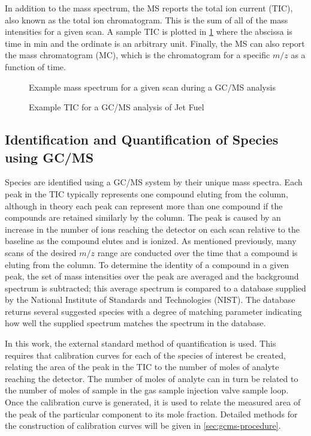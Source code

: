 \documentclass[../main.tex]{subfiles}
\begin{document}
In addition to the mass spectrum, the MS reports the total ion current (TIC),
also known as the total ion chromatogram. This is the sum of all of the mass
intensities for a given scan. A sample TIC is plotted in \cref{fig:gcms-tic}
where the abscissa is time in \si{\minute} and the ordinate is an arbitrary unit.
Finally, the MS can also report the mass chromatogram (MC), which is the
chromatogram for a specific $m/z$ as a function of time.

\begin{figure}
    \begin{floatrow}
            {\caption{Example mass spectrum for a given scan during a GC/MS analysis}
            \label{fig:gcms-mass-spec}}
            {\caption{Example TIC for a GC/MS analysis of Jet Fuel}
            \label{fig:gcms-tic}}
    \end{floatrow}
\end{figure}

\subsection{Identification and Quantification of Species using GC/MS}

Species are identified using a GC/MS system by their unique mass spectra.
Each peak in the TIC typically represents one compound eluting from the
column, although in theory each peak can represent more than one compound
if the compounds are retained similarly by the column. The peak is caused
by an increase in the number of ions reaching the detector on each scan
relative to the baseline as the compound elutes and is ionized. As
mentioned previously, many scans of the desired $m/z$ range are
conducted over the time that a compound is eluting from the column.
To determine the identity of a compound in a given peak, the set of
mass intensities over the peak are averaged and the background
spectrum is subtracted; this average spectrum is compared to a
database supplied by the National Institute of Standards and
Technologies (NIST). The database returns several suggested species
with a degree of matching parameter indicating how well the supplied
spectrum matches the spectrum in the database.

In this work, the external standard method of quantification is used.
This requires that calibration curves for each of the species of
interest be created, relating the area of the peak in the TIC to
the number of moles of analyte reaching the detector. The number of
moles of analyte can in turn be related to the number of moles of
sample in the gas sample injection valve sample loop. Once the
calibration curve is generated, it is used to relate the measured
area of the peak of the particular component to its mole fraction. Detailed
methods for the construction of calibration curves will be given in
\cref{sec:gcms-procedure}.
\end{document}
